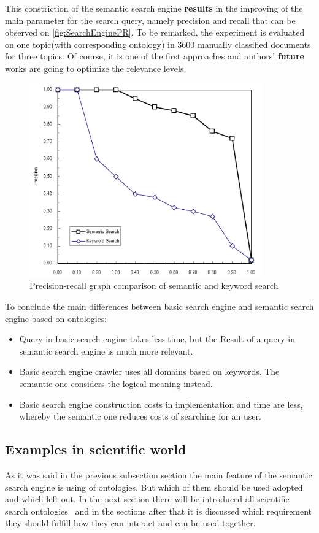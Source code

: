 		This constriction of the semantic search engine \textbf{results} in the improving of the main parameter for the search query, namely precision and recall that can be observed on \autoref{fig:SearchEnginePR}. To be remarked, the experiment is evaluated on one topic(with corresponding ontology) in  3600 manually classified documents for three topics. Of course, it is one of the first approaches and authors' \textbf{future} works are going to optimize the relevance levels.
		\begin{figure}
			\centering
			\includegraphics[width=10cm]{images/SearchEnginePR.PNG}
			\caption{Precision-recall graph comparison of semantic and keyword search\cite[p. 1918]{Fang05}}
			\label{fig:SearchEnginePR}
		\end{figure}
		To conclude the main differences between basic search engine and semantic search engine based on ontologies\cite[p.653]{Gup12}:
			\begin{itemize}
				\item Query in basic search engine takes less time, but the  Result of a query in semantic search engine is much more relevant.
				\item Basic search engine crawler uses all domains based on keywords. The semantic one considers the logical meaning instead. 
				\item Basic search engine construction costs in implementation and time are less, whereby the semantic one reduces costs of searching for an user.   
			\end{itemize} 
		\subsection{Examples in scientific world}
		As it was said in the previous subsection section the main feature of the semantic search engine is using of ontologies. But which of them should be used adopted and which left out. In the next section there will be introduced all scientific search ontologies \frqq \ and in the sections after that it is discussed which requirement they should fulfill how they can interact and can be used together.
		
